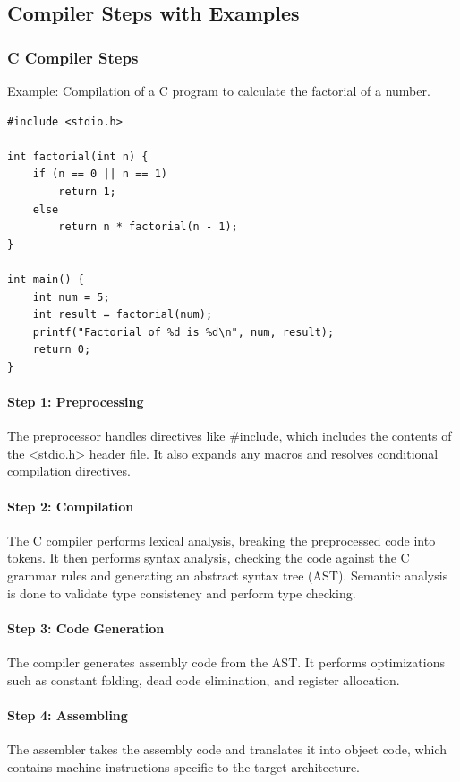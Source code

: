 \documentclass[12pt]{article}
\begin{document}
\subsection*{Compiler Steps with Examples}

\subsubsection*{C Compiler Steps}
Example: Compilation of a C program to calculate the factorial of a number.

\begin{lstlisting}
#include <stdio.h>

int factorial(int n) {
    if (n == 0 || n == 1)
        return 1;
    else
        return n * factorial(n - 1);
}

int main() {
    int num = 5;
    int result = factorial(num);
    printf("Factorial of %d is %d\n", num, result);
    return 0;
}
\end{lstlisting}

\paragraph*{Step 1: Preprocessing}
The preprocessor handles directives like \#include, which includes the contents of the <stdio.h> header file. It also expands any macros and resolves conditional compilation directives.

\paragraph*{Step 2: Compilation}
The C compiler performs lexical analysis, breaking the preprocessed code into tokens. It then performs syntax analysis, checking the code against the C grammar rules and generating an abstract syntax tree (AST). Semantic analysis is done to validate type consistency and perform type checking.

\paragraph*{Step 3: Code Generation}
The compiler generates assembly code from the AST. It performs optimizations such as constant folding, dead code elimination, and register allocation.

\paragraph*{Step 4: Assembling}
The assembler takes the assembly code and translates it into object code, which contains machine instructions specific to the target architecture.
\end{document}
